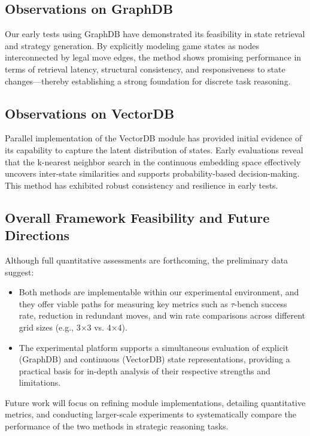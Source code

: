 \documentclass{article}
\begin{document}
\subsection{Observations on GraphDB}
Our early tests using GraphDB have demonstrated its feasibility in state retrieval and strategy generation. By explicitly modeling game states as nodes interconnected by legal move edges, the method shows promising performance in terms of retrieval latency, structural consistency, and responsiveness to state changes—thereby establishing a strong foundation for discrete task reasoning.

\subsection{Observations on VectorDB}
Parallel implementation of the VectorDB module has provided initial evidence of its capability to capture the latent distribution of states. Early evaluations reveal that the k-nearest neighbor search in the continuous embedding space effectively uncovers inter-state similarities and supports probability-based decision-making. This method has exhibited robust consistency and resilience in early tests.

\subsection{Overall Framework Feasibility and Future Directions}
Although full quantitative assessments are forthcoming, the preliminary data suggest:
\begin{itemize}
    \item Both methods are implementable within our experimental environment, and they offer viable paths for measuring key metrics such as $\tau$-bench success rate, reduction in redundant moves, and win rate comparisons across different grid sizes (e.g., 3$\times$3 vs. 4$\times$4).
    \item The experimental platform supports a simultaneous evaluation of explicit (GraphDB) and continuous (VectorDB) state representations, providing a practical basis for in-depth analysis of their respective strengths and limitations.
\end{itemize}
Future work will focus on refining module implementations, detailing quantitative metrics, and conducting larger-scale experiments to systematically compare the performance of the two methods in strategic reasoning tasks.
\end{document}

